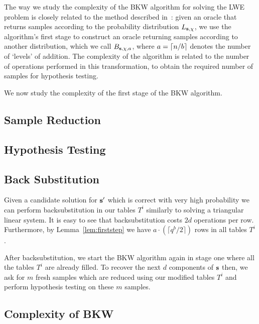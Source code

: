 The way we study the complexity of the BKW algorithm for solving the LWE problem is closely related to the method described in~\cite{FL06}: given an oracle that returns samples according to the probability distribution $L_{\mathbf{s},\chi}$, we use the algorithm's first stage to construct an oracle returning samples according to another distribution, which we call $B_{\mathbf{s},\chi,a}$, where $a = \lceil n/b \rceil$ denotes the number of `levels' of addition. The complexity of the algorithm is related to the number of operations performed in this transformation, to obtain the required number of samples for hypothesis testing.

We now study the complexity of the first stage of the BKW algorithm.

\subsection{Sample Reduction}




\subsection{Hypothesis Testing}
\label{sec:hypothesis}


\subsection{Back Substitution}
\label{sec:backsubstitution}

Given a candidate solution for $\mathbf{s'}$ which is correct with very high probability we can perform backsubstitution in our tables $T^i$ similarly to solving a triangular linear system. It is easy to see that backsubstitution costs $2d$ operations per row. Furthermore, by Lemma~\ref{lem:firststep} we have $a \cdot( \lceil q^b/2\rceil )$ rows in all tables $T^i$.

After backsubstitution, we start the BKW algorithm again in stage one where all the tables $T^i$ are already filled. To recover the next $d$ components of $\mathbf{s}$ then, we ask for $m$ fresh samples which are reduced using our modified tables $T^i$ and perform hypothesis testing on these $m$ samples.

\subsection{Complexity of BKW}\label{subsection:complexity_search}

